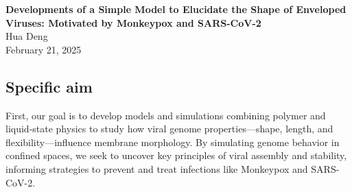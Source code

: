 \documentclass[12pt]{article}
\begin{document}
\doublespacing


\begin{center}
{\Large \textbf{Developments of a Simple Model to Elucidate the Shape of Enveloped Viruses: Motivated by Monkeypox and SARS-CoV-2}}\\[1.5ex]
{\normalsize  Hua Deng}\\

{\normalsize February 21, 2025}
\end{center}





\begin{flushleft}
\setlength{\parindent}{30pt}
\section*{Specific aim}

First, our goal is to develop models and simulations combining polymer and liquid-state physics to study how viral genome properties—shape, length, and flexibility—influence membrane morphology. By simulating genome behavior in confined spaces, we seek to uncover key principles of viral assembly and stability, informing strategies to prevent and treat infections like Monkeypox and SARS-CoV-2.


\end{flushleft}
\end{document}
